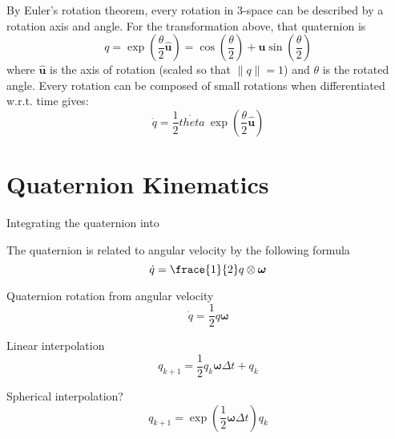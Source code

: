 \documentclass[lettersize,journal]{IEEEtran}
\begin{document}
By Euler's rotation theorem, every rotation in 3-space can be described by a rotation axis and angle. For the transformation above, that quaternion is
\begin{equation}
  q = \exp\left(\frac{\theta}{2}\hat{\mathbf{u}}\right) = \cos\left(\frac{\theta}{2}\right) + \mathbf{u} \sin\left( \frac{\theta}{2}\right)
\end{equation}
where $\hat{\mathbf{u}}$ is the axis of rotation (scaled so that $\|q\|=1$) and $\theta$ is the rotated angle. Every rotation can be composed of small rotations when differentiated w.r.t. time gives:
\begin{equation}
  \dot{q} = \frac{1}{2} \dot{theta} \ \exp\left(\frac{\theta}{2} \hat{\mathbf{u}} \right)
\end{equation}

\section*{Quaternion Kinematics}
Integrating the quaternion into 

The quaternion is related to angular velocity by the following formula
\begin{equation}
  \dot{q} = \frace{1}{2} q \otimes \boldsymbol\omega
\end{equation}



Quaternion rotation from angular velocity
\begin{equation}
  \dot{q} = \frac{1}{2} q\boldsymbol\omega
\end{equation}

Linear interpolation
\begin{equation}
  q_{k+1} = \frac{1}{2}q_k\boldsymbol\omega\Delta t + q_k 
\end{equation}

Spherical interpolation?
\begin{equation}
  q_{k+1} = \exp\left(\frac{1}{2} \boldsymbol\omega\Delta t\right)q_k
\end{equation}


\end{document}
